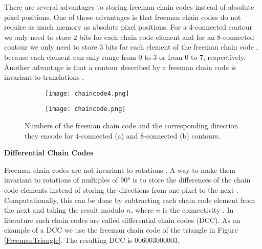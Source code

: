 \documentclass[thesis.tex]{subfiles}
\begin{document}
There are several advantages to storing freeman chain codes instead of absolute pixel positions. One of those advantages is that freeman chain codes do not require as much memory as absolute pixel positions. For a 4-connected contour we only need to store 2 bits for each chain code element and for an 8-connected contour we only need to store 3 bits for each element of the freeman chain code \cite{Ballard:1982:CV:578131}, because each element can only range from 0 to 3 or from 0 to 7, respectively. Another advantage is that a contour described by a freeman chain code is invariant to translations \cite{yang2008su}.
\begin{figure}
	\begin{subfigure}[t]{0.4\textwidth}
		\texttt{[image: chaincode4.png]}
	\caption{}		
	\end{subfigure}
\hspace{0.1\textwidth}
	\begin{subfigure}[t]{0.4\textwidth}
		\texttt{[image: chaincode.png]}		
\caption{}	
	\end{subfigure}
	\caption{Numbers of the freeman chain code  and the corresponding direction they encode for 4-connected (a) and 8-connected (b) contours.}
\label{fig:freeman}
\end{figure}

\textbf{Differential Chain Codes}

 Freeman chain codes are not invariant to rotations \cite{yang2008su,Ballard:1982:CV:578131}. A way to make them invariant to rotations of multiples of 90\si{\degree} is to store the differences of the chain code elements instead of storing the directions from one pixel to the next  \cite{yang2008su}. Computationally, this can be done by subtracting each chain code element from the next and taking the result modulo $n$, where $n$ is the connectivity \cite{yang2008su}. In literature such chain codes are called differential chain codes (DCC). As an example of a DCC we use the freeman chain code of the triangle in Figure \ref{FreemanTriangle}. The resulting DCC is 006003000003.
\end{document}
